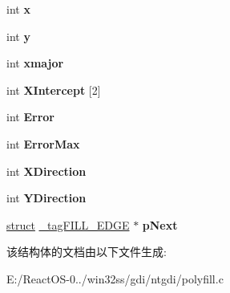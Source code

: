 \begin{DoxyCompactItemize}
int {\bfseries x}
\item 
\mbox{\label{struct__tag_f_i_l_l___e_d_g_e_a7fd10cdf8716479e38fa3dfa2f9ba57e}} 
int {\bfseries y}
\item 
\mbox{\label{struct__tag_f_i_l_l___e_d_g_e_a236c558660515ce2d021d3b768deb27a}} 
int {\bfseries xmajor}
\item 
\mbox{\label{struct__tag_f_i_l_l___e_d_g_e_a267f565588c4caff47dc2999bb449ec1}} 
int {\bfseries X\+Intercept} \mbox{[}2\mbox{]}
\item 
\mbox{\label{struct__tag_f_i_l_l___e_d_g_e_ae4ca0dbb4d2b1f87df91f58608514aa1}} 
int {\bfseries Error}
\item 
\mbox{\label{struct__tag_f_i_l_l___e_d_g_e_a856e0412973d734ea461e5ddf75cc9b7}} 
int {\bfseries Error\+Max}
\item 
\mbox{\label{struct__tag_f_i_l_l___e_d_g_e_ad0a45b252362fa79448cafc3f41d75bc}} 
int {\bfseries X\+Direction}
\item 
\mbox{\label{struct__tag_f_i_l_l___e_d_g_e_ab22310a4d3b7041ddaaf0f67cb9965b4}} 
int {\bfseries Y\+Direction}
\item 
\mbox{\label{struct__tag_f_i_l_l___e_d_g_e_af28648cb00da8ec89d79de63bbef3bbe}} 
\hyperlink{interfacestruct}{struct} \hyperlink{struct__tag_f_i_l_l___e_d_g_e}{\+\_\+tag\+F\+I\+L\+L\+\_\+\+E\+D\+GE} $\ast$ {\bfseries p\+Next}
\end{DoxyCompactItemize}


该结构体的文档由以下文件生成\+:\begin{DoxyCompactItemize}
\item 
E\+:/\+React\+O\+S-\/0../win32ss/gdi/ntgdi/polyfill.\+c\end{DoxyCompactItemize}
